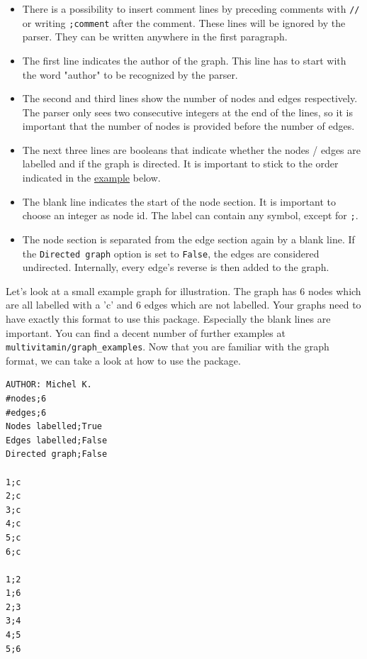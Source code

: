 \documentclass{SeminarV2}
\begin{document}
\begin{itemize}
	\item There is a possibility to insert comment lines by preceding comments with \texttt{//} or writing \texttt{;comment} after the comment. These lines will be ignored by the parser. They can be written anywhere in the first paragraph.
	\item The first line indicates the author of the graph. This line has to start with the word "author" to be recognized by the parser.
	\item The second and third lines show the number of nodes and edges respectively. The parser only sees two consecutive integers at the end of the lines, so it is important that the number of nodes is provided before the number of edges.
	\item The next three lines are booleans that indicate whether the nodes / edges are labelled and if the graph is directed. It is important to stick to the order indicated in the \hyperref[fig:graph_example]{example} below.
	\item The blank line indicates the start of the node section. It is important to choose an integer as node id. The label can contain any symbol, except for \texttt{;}.
	\item The node section is separated from the edge section again by a blank line. If the \texttt{Directed graph} option is set to \texttt{False}, the edges are considered undirected. Internally, every edge's reverse is then added to the graph.  
\end{itemize}

\noindent
Let's look at a small example graph for illustration. The graph has 6 nodes which are all labelled with a 'c' and 6 edges which are not labelled. Your graphs need to have exactly this format to use this package. Especially the blank lines are important. You can find a decent number of further examples at \texttt{multivitamin/graph_examples}. Now that you are familiar with the graph format, we can take a look at how to use the package.


\begin{framed}
\label{fig:graph_example}
\begin{verbatim} 
AUTHOR: Michel K.
#nodes;6
#edges;6
Nodes labelled;True
Edges labelled;False
Directed graph;False

1;c
2;c
3;c
4;c
5;c
6;c

1;2
1;6
2;3
3;4
4;5
5;6
\end{verbatim}
\end{framed}
\end{document}
